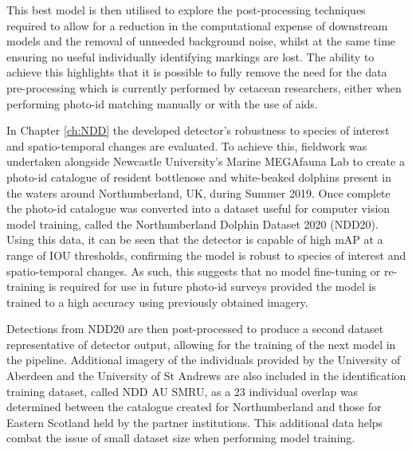 This best model is then utilised to explore the post-processing techniques required to allow for a reduction in the computational expense of downstream models and the removal of unneeded background noise, whilst at the same time ensuring no useful individually identifying markings are lost. The ability to achieve this highlights that it is possible to fully remove the need for the data pre-processing which is currently performed by cetacean researchers, either when performing photo-id matching manually or with the use of aids.

In Chapter \ref{ch:NDD} the developed detector's robustness to species of interest and spatio-temporal changes are evaluated. To achieve this, fieldwork was undertaken alongside Newcastle University's Marine MEGAfauna Lab to create a photo-id catalogue of resident bottlenose and white-beaked dolphins present in the waters around Northumberland, UK, during Summer 2019. Once complete the photo-id catalogue was converted into a dataset useful for computer vision model training, called the Northumberland Dolphin Dataset 2020 (NDD20). Using this data, it can be seen that the detector is capable of high mAP at a range of IOU thresholds, confirming the model is robust to species of interest and spatio-temporal changes. As such, this suggests that no model fine-tuning or re-training is required for use in future photo-id surveys provided the model is trained to a high accuracy using previously obtained imagery. 

Detections from NDD20 are then post-processed to produce a second dataset representative of detector output, allowing for the training of the next model in the pipeline. Additional imagery of the individuals provided by the University of Aberdeen and the University of St Andrews are also included in the identification training dataset, called NDD AU SMRU, as a 23 individual overlap was determined between the catalogue created for Northumberland and those for Eastern Scotland held by the partner institutions. This additional data helps combat the issue of small dataset size when performing model training. 

